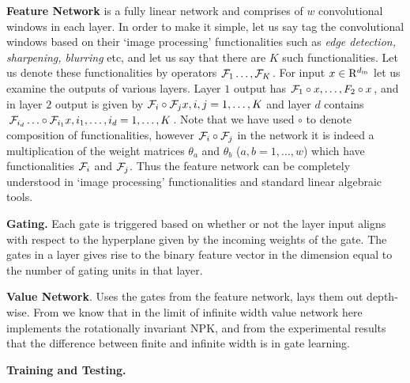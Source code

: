 \textbf{Feature Network} is a fully linear network and comprises of $w$ convolutional windows in each layer. In order to make it simple, let us say tag the convolutional windows based on their `image processing' functionalities such as \emph{edge detection, sharpening, blurring} etc, and let us say that there are $K$ such functionalities. Let us denote these functionalities by operators $\mathcal{F}_1\ldots, \mathcal{F}_K$. For input $x\in\mathrm{R}^{d_{\text{in}}}$ let us examine the outputs of various layers. Layer $1$ output has $\mathcal{F}_1\circ x ,\ldots, F_2\circ x$, and in layer $2$ output is given by $\mathcal{F}_i\circ\mathcal{F}_j x,i,j =1,\ldots,K$ and layer $d$ contains $\mathcal{F}_{i_d}\ldots\circ \mathcal{F}_{i_1} x, i_1,\ldots,i_d =1,\ldots,K$.  Note that we have used $\circ$ to denote composition of functionalities, however $\mathcal{F}_i\circ\mathcal{F}_j$ in the network it is indeed a multiplication of the weight matrices $\theta_a$ and $\theta_b$ ($a,b=1,\ldots,w$) which have functionalities $\mathcal{F}_i$ and $\mathcal{F}_j$. Thus the feature network can be completely understood in `image processing' functionalities and standard linear algebraic tools.

\textbf{Gating.} Each gate is triggered based on whether or not the layer input aligns with respect to the hyperplane given by the  incoming weights of the gate. The gates in a layer gives rise to the binary feature vector in the dimension equal to the number of gating units in that layer.

\textbf{Value Network}. Uses the gates from the feature network, lays them out depth-wise. From  we know that in the limit of infinite width value network here implements the rotationally invariant NPK, and from the experimental results that the difference between finite and infinite width is in gate learning.

\textbf{Training and Testing.}
